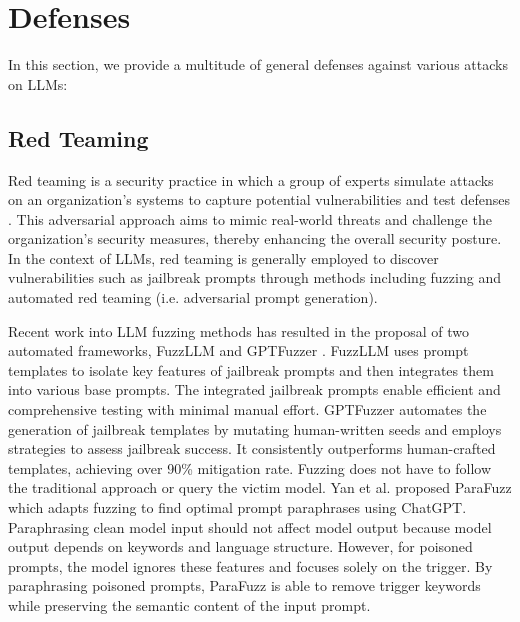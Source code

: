 \section{Defenses} \label{sec:defense}

In this section, we provide a multitude of general defenses against various attacks on LLMs:

\subsection{Red Teaming}

Red teaming is a security practice in which a group of experts simulate attacks on an organization's systems to capture potential vulnerabilities and test defenses \cite{casper_2023b,ganguli_2022a}. This adversarial approach aims to mimic real-world threats and challenge the organization’s security measures, thereby enhancing the overall security posture. In the context of LLMs, red teaming is generally employed to discover vulnerabilities such as jailbreak prompts through methods including fuzzing and automated red teaming (i.e. adversarial prompt generation).

Recent work into LLM fuzzing methods has resulted in the proposal of two automated frameworks, FuzzLLM \cite{yao_2023a} and GPTFuzzer \cite{yu_2023a}. FuzzLLM uses prompt templates to isolate key features of jailbreak prompts and then integrates them into various base prompts. The integrated jailbreak prompts enable efficient and comprehensive testing with minimal manual effort. GPTFuzzer automates the generation of jailbreak templates by mutating human-written seeds and employs strategies to assess jailbreak success. It consistently outperforms human-crafted templates, achieving over 90\% mitigation rate. Fuzzing does not have to follow the traditional approach or query the victim model. Yan et al. \cite{yan_2023a} proposed ParaFuzz which adapts fuzzing to find optimal prompt paraphrases using ChatGPT. Paraphrasing clean model input should not affect model output because model output depends on keywords and language structure. However, for poisoned prompts, the model ignores these features and focuses solely on the trigger. By paraphrasing poisoned prompts, ParaFuzz is able to remove trigger keywords while preserving the semantic content of the input prompt.

